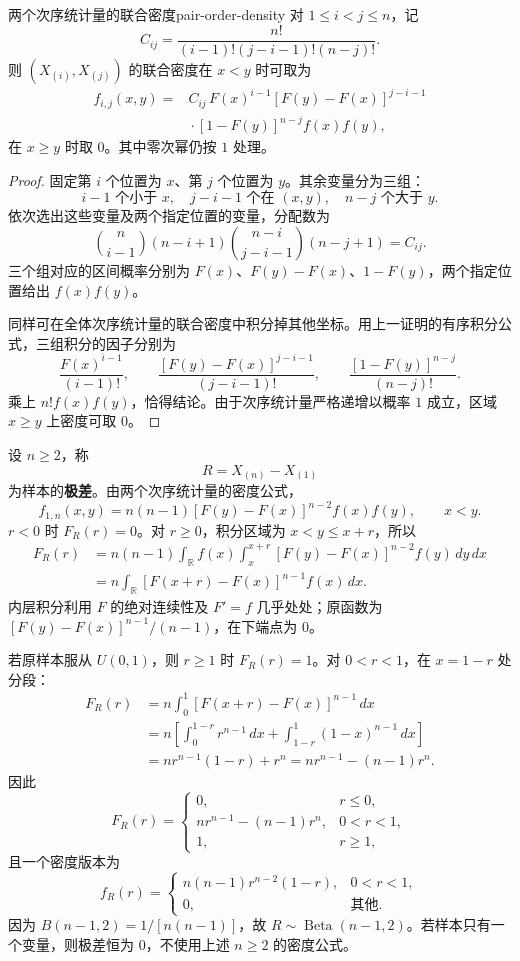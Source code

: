 \begin{mytheorem}{两个次序统计量的联合密度}{pair-order-density}
对 $1\leq i<j\leq n$，记
\[
C_{ij}=\frac{n!}{(i-1)!(j-i-1)!(n-j)!}.
\]
则 $(X_{(i)},X_{(j)})$ 的联合密度在 $x<y$ 时可取为
\[
\begin{aligned}
f_{i,j}(x,y)
={}&C_{ij}\,F(x)^{i-1}[F(y)-F(x)]^{j-i-1}\\
&{}\cdot[1-F(y)]^{n-j}f(x)f(y),
\end{aligned}
\]
在 $x\geq y$ 时取 $0$。其中零次幂仍按 $1$ 处理。
\end{mytheorem}
\begin{proof}
固定第 $i$ 个位置为 $x$、第 $j$ 个位置为 $y$。其余变量分为三组：
\[
i-1\text{ 个小于 }x,\quad
j-i-1\text{ 个在 }(x,y),\quad
n-j\text{ 个大于 }y.
\]
依次选出这些变量及两个指定位置的变量，分配数为
\[
\binom n{i-1}(n-i+1)
\binom{n-i}{j-i-1}(n-j+1)=C_{ij}.
\]
三个组对应的区间概率分别为 $F(x)$、$F(y)-F(x)$、$1-F(y)$，两个指定位置给出 $f(x)f(y)$。

同样可在全体次序统计量的联合密度中积分掉其他坐标。用上一证明的有序积分公式，三组积分的因子分别为
\[
\frac{F(x)^{i-1}}{(i-1)!},\qquad
\frac{[F(y)-F(x)]^{j-i-1}}{(j-i-1)!},\qquad
\frac{[1-F(y)]^{n-j}}{(n-j)!}.
\]
乘上 $n!f(x)f(y)$，恰得结论。由于次序统计量严格递增以概率 $1$ 成立，区域 $x\geq y$ 上密度可取 $0$。
\end{proof}

\begin{example}[样本极差的分布]
设 $n\geq2$，称
\[
R=X_{(n)}-X_{(1)}
\]
为样本的\textbf{极差}。由两个次序统计量的密度公式，
\[
f_{1,n}(x,y)=n(n-1)[F(y)-F(x)]^{n-2}f(x)f(y),
\qquad x<y.
\]
$r<0$ 时 $F_R(r)=0$。对 $r\geq0$，积分区域为 $x<y\leq x+r$，所以
\begin{align*}
F_R(r)
&=n(n-1)\int_{\mathbb R}f(x)
 \int_x^{x+r}[F(y)-F(x)]^{n-2}f(y)\,dy\,dx\\
&=n\int_{\mathbb R}[F(x+r)-F(x)]^{n-1}f(x)\,dx.
\end{align*}
内层积分利用 $F$ 的绝对连续性及 $F'=f$ 几乎处处；原函数为
$[F(y)-F(x)]^{n-1}/(n-1)$，在下端点为 $0$。

若原样本服从 $U(0,1)$，则 $r\geq1$ 时 $F_R(r)=1$。对 $0<r<1$，在 $x=1-r$ 处分段：
\begin{align*}
F_R(r)
&=n\int_0^1[F(x+r)-F(x)]^{n-1}\,dx\\
&=n\left[\int_0^{1-r}r^{n-1}\,dx+
 \int_{1-r}^1(1-x)^{n-1}\,dx\right]\\
&=nr^{n-1}(1-r)+r^n
=nr^{n-1}-(n-1)r^n.
\end{align*}
因此
\[
F_R(r)=
\begin{cases}
0,&r\leq0,\\
nr^{n-1}-(n-1)r^n,&0<r<1,\\
1,&r\geq1,
\end{cases}
\]
且一个密度版本为
\[
f_R(r)=
\begin{cases}
n(n-1)r^{n-2}(1-r),&0<r<1,\\
0,&\text{其他}.
\end{cases}
\]
因为 $B(n-1,2)=1/[n(n-1)]$，故 $R\sim\operatorname{Beta}(n-1,2)$。若样本只有一个变量，则极差恒为 $0$，不使用上述 $n\geq2$ 的密度公式。
\end{example}


